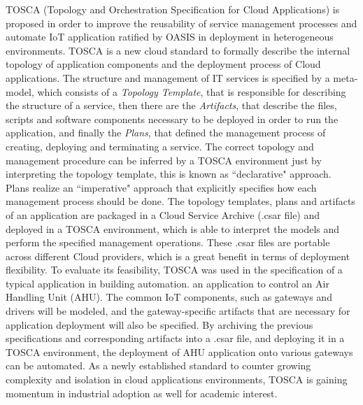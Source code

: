 TOSCA (Topology and Orchestration Specification for Cloud Applications) \cite{li2013towards} is
proposed in order to improve the reusability of service management processes and automate IoT application
ratified by OASIS in \cite{} deployment in heterogeneous environments. TOSCA is a new cloud standard to formally
describe the internal topology of application components and the deployment process of Cloud applications.
The structure and management of IT services is specified by a meta-model, which consists of
a \textit{Topology Template}, that is responsible for describing the structure of a service, then there
are the \textit{Artifacts}, that describe the files, scripts and software components necessary to be
deployed in order to run the application, and finally the \textit{Plans}, that defined the management process
of creating, deploying and terminating a service. The correct topology and management procedure can be inferred
by a TOSCA environment just by interpreting the topology template, this is known as ``declarative" approach.
Plans realize an ``imperative" approach that explicitly specifies how each management process should be done.
The topology templates, plans and artifacts of an application are packaged in a Cloud Service Archive (.csar file)
and deployed in a TOSCA environment, which is able to interpret the models and perform the specified management
operations. These .csar files are portable across different Cloud providers, which is a great benefit in terms
of deployment flexibility. To evaluate its feasibility, TOSCA was used in the specification of a typical
application in building automation. an application to control an Air Handling Unit (AHU). The common IoT
components, such as gateways and drivers will be modeled, and the gateway-specific artifacts that are
necessary for application deployment will also be specified. By archiving the previous specifications
and corresponding artifacts into a .csar file, and deploying it in a TOSCA environment, the deployment
of AHU application onto various gateways can be automated. As a newly established standard to counter
growing complexity and isolation in cloud applications environments, TOSCA is gaining momentum in industrial
adoption as well for academic interest.\\

